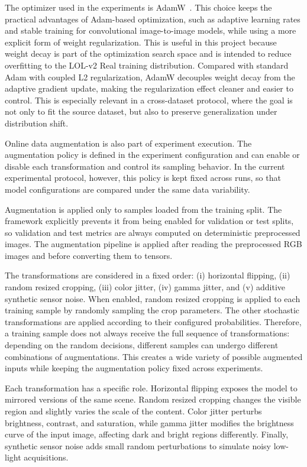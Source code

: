 The optimizer used in the experiments is AdamW~\cite{DBLP:conf/iclr/LoshchilovH19}. This choice keeps the practical advantages of Adam-based optimization, such as adaptive learning rates and stable training for convolutional image-to-image models, while using a more explicit form of weight regularization. This is useful in this project because weight decay is part of the optimization search space and is intended to reduce overfitting to the LOL-v2 Real training distribution. Compared with standard Adam with coupled L2 regularization, AdamW decouples weight decay from the adaptive gradient update, making the regularization effect cleaner and easier to control. This is especially relevant in a cross-dataset protocol, where the goal is not only to fit the source dataset, but also to preserve generalization under distribution shift.

Online data augmentation is also part of experiment execution. The augmentation policy is defined in the experiment configuration and can enable or disable each transformation and control its sampling behavior. In the current experimental protocol, however, this policy is kept fixed across runs, so that model configurations are compared under the same data variability.

Augmentation is applied only to samples loaded from the training split. The framework explicitly prevents it from being enabled for validation or test splits, so validation and test metrics are always computed on deterministic preprocessed images. The augmentation pipeline is applied after reading the preprocessed RGB images and before converting them to tensors.

The transformations are considered in a fixed order: (i) horizontal flipping, (ii) random resized cropping, (iii) color jitter, (iv) gamma jitter, and (v) additive synthetic sensor noise. When enabled, random resized cropping is applied to each training sample by randomly sampling the crop parameters. The other stochastic transformations are applied according to their configured probabilities. Therefore, a training sample does not always receive the full sequence of transformations: depending on the random decisions, different samples can undergo different combinations of augmentations. This creates a wide variety of possible augmented inputs while keeping the augmentation policy fixed across experiments.

Each transformation has a specific role. Horizontal flipping exposes the model to mirrored versions of the same scene. Random resized cropping changes the visible region and slightly varies the scale of the content. Color jitter perturbs brightness, contrast, and saturation, while gamma jitter modifies the brightness curve of the input image, affecting dark and bright regions differently. Finally, synthetic sensor noise adds small random perturbations to simulate noisy low-light acquisitions.

